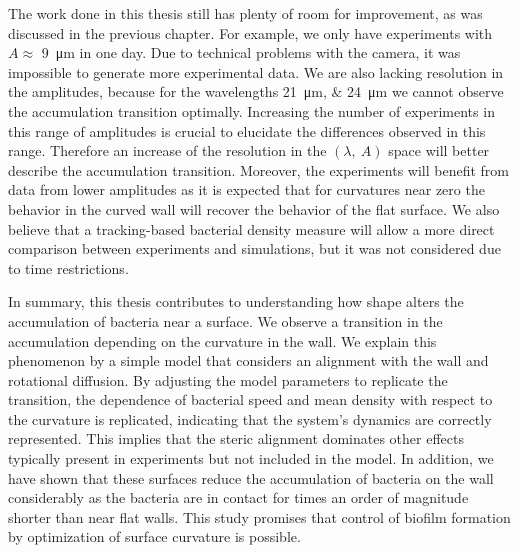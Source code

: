 The work done in this thesis still has plenty of room for improvement, as was discussed in the previous chapter. For example, we only have experiments with $A\approx$ \SI{9}{\micro\meter} in one day. Due to technical problems with the camera, it was impossible to generate more experimental data. We are also lacking resolution in the amplitudes, because for the wavelengths \SIlist{21;24}{\micro\meter} we cannot observe the accumulation transition optimally. Increasing the number of experiments in this range of amplitudes is crucial to elucidate the differences observed in this range. Therefore an increase of the resolution in the  $(\lambda, \ A)$ space will better describe the accumulation transition. Moreover, the experiments will benefit from data from lower amplitudes as it is expected that for curvatures near zero the behavior in the curved wall will recover the behavior of the flat surface. We also believe that a tracking-based bacterial density measure will allow a more direct comparison between experiments and simulations, but it was not considered due to time restrictions.

In summary, this thesis contributes to understanding how shape alters the accumulation of bacteria near a surface. We observe a transition in the accumulation depending on the curvature in the wall. We explain this phenomenon by a simple model that considers an alignment with the wall and rotational diffusion. By adjusting the model parameters to replicate the transition, the dependence of bacterial speed and mean density with respect to the curvature is replicated, indicating that the system's dynamics are correctly represented. This implies that the steric alignment dominates other effects typically present in experiments but not included in the model. In addition, we have shown that these surfaces reduce the accumulation of bacteria on the wall considerably as the bacteria are in contact for times an order of magnitude shorter than near flat walls. This study promises that control of biofilm formation by optimization of surface curvature is possible.
